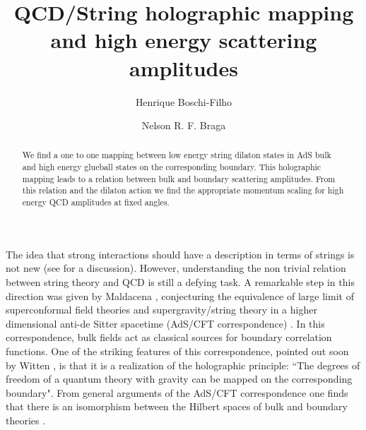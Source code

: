 \documentclass[a4paper,twocolumn,prd,groupedaddress,nofootinbib]{revtex4}
\begin{document}
\title{
QCD/String holographic mapping and high energy scattering amplitudes}


\author{Henrique Boschi-Filho}
\author{Nelson R. F. Braga}

 
\begin{abstract}
We find a one to one mapping between low energy string dilaton states
in AdS bulk and high energy glueball states on the corresponding boundary. 
This holographic mapping leads to a relation between bulk and boundary 
scattering amplitudes. From this relation and the dilaton action we find 
the appropriate momentum scaling for high energy QCD amplitudes at fixed 
angles.  
\end{abstract}

\maketitle



\vfill\eject

The idea that strong interactions should have a description in terms 
of strings is not new \cite{Planar} (see \cite{Pol} for a discussion). 
However, understanding the non trivial relation between string theory 
and QCD is still a defying task.  
A remarkable step in this direction was given by Maldacena \cite{Malda}, 
conjecturing the equivalence of large \coordHE{} limit of \coordHE{} 
superconformal field theories and 
supergravity/string theory in a higher dimensional anti-de 
Sitter spacetime (AdS/CFT correspondence) \cite{GKP,Wi,Malda2}.  
In this correspondence, bulk fields act as classical sources for boundary 
correlation functions\cite{GKP,Wi,Malda2,MV,FMMR}.
One of the striking features of this  correspondence, pointed out soon by 
Witten \cite{Wi}, is that it is a realization of the holographic principle: 
``The degrees of freedom of  a quantum theory with gravity can be mapped 
on the corresponding boundary"\cite{HOL1,HOL2,HOL3,HOL4,HOL5}. 
From general arguments of the AdS/CFT correspondence one finds that there 
is an isomorphism between the Hilbert spaces of bulk and boundary  
theories \cite{HS1,HS2,HS3,HS4}. 
\end{document}
